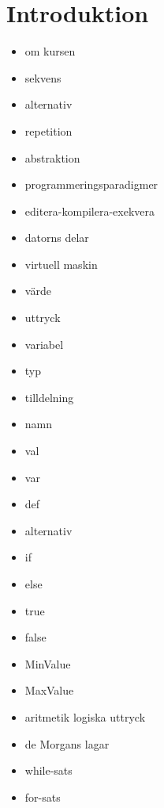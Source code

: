\chapter{Introduktion}
\begin{itemize}[nosep]
\item om kursen
\item sekvens
\item alternativ
\item repetition
\item abstraktion
\item programmeringsparadigmer
\item editera-kompilera-exekvera
\item datorns delar
\item virtuell maskin
\item värde
\item uttryck
\item variabel
\item typ
\item tilldelning
\item namn
\item val
\item var
\item def
\item alternativ
\item if
\item else
\item true
\item false
\item MinValue
\item MaxValue
\item aritmetik logiska uttryck
\item de Morgans lagar
\item while-sats
\item for-sats\end{itemize}